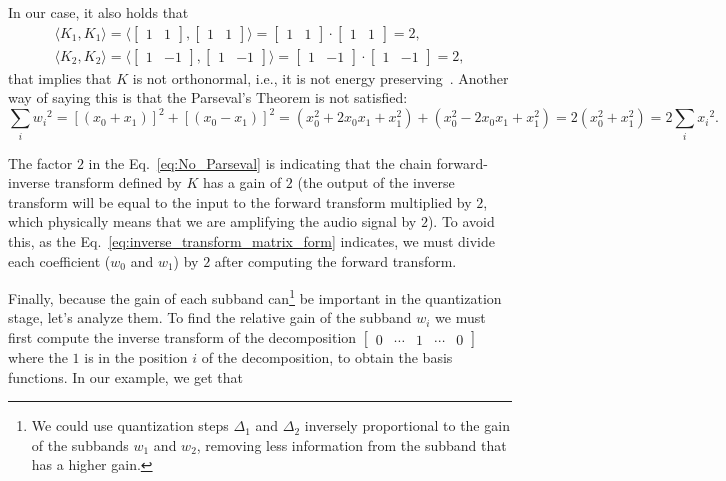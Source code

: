 In our case, it also holds that
\begin{equation}
\begin{array}{l}
  \langle K_1,K_1 \rangle =
  \langle \begin{bmatrix}
    1 & 1
  \end{bmatrix}
  ,
  \begin{bmatrix}
    1 & 1
  \end{bmatrix}
  \rangle =
  \begin{bmatrix}
    1 & 1
  \end{bmatrix}
  \cdot
  \begin{bmatrix}
    1 & 1
  \end{bmatrix}
   = 2,
   \\
     \langle K_2,K_2 \rangle =
  \langle \begin{bmatrix}
    1 & -1
  \end{bmatrix}
  ,
  \begin{bmatrix}
    1 & -1
  \end{bmatrix}
  \rangle =
  \begin{bmatrix}
    1 & -1
  \end{bmatrix}
  \cdot
  \begin{bmatrix}
    1 & -1
  \end{bmatrix}
   = 2,
   \end{array}
\end{equation}
that implies that $K$ is not orthonormal, i.e., it is not energy
preserving~\cite{sayood2017introduction}. Another way of saying this
is that the Parseval's Theorem is not satisfied:
\begin{equation}
  \sum_i {w_i}^2 =
  \left[(x_0+x_1)\right]^2 + \left[(x_0-x_1)\right]^2 =
  (x_0^2+2x_0x_1+x_1^2) + (x_0^2-2x_0x_1+x_1^2) =
  2(x_0^2+x_1^2) =
  2\sum_i {x_i}^2.
  \label{eq:No_Parseval}
\end{equation}


The factor $2$ in the Eq.~\ref{eq:No_Parseval} is indicating that the
chain forward-inverse transform defined by $K$ has a gain of $2$ (the
output of the inverse transform will be equal to the input to the
forward transform multiplied by $2$, which physically means that we
are amplifying the audio signal by $2$). To avoid this, as the
Eq.~\ref{eq:inverse_transform_matrix_form} indicates, we must divide
each coefficient ($w_0$ and $w_1$) by $2$ after computing the forward
transform.

Finally, because the gain of each subband can\footnote{We could use
quantization steps $\Delta_1$ and $\Delta_2$ inversely proportional to
the gain of the subbands $w_1$ and $w_2$, removing less information
from the subband that has a higher gain.} be important in the
quantization stage, let's analyze them. To find the relative gain of
the subband $w_i$ we must first compute the inverse transform of the
decomposition $\begin{bmatrix} 0 & \cdots & 1 & \cdots &
  0 \end{bmatrix}$ where the $1$ is in the position $i$ of the
decomposition, to obtain the basis functions. In our example, we get
that

